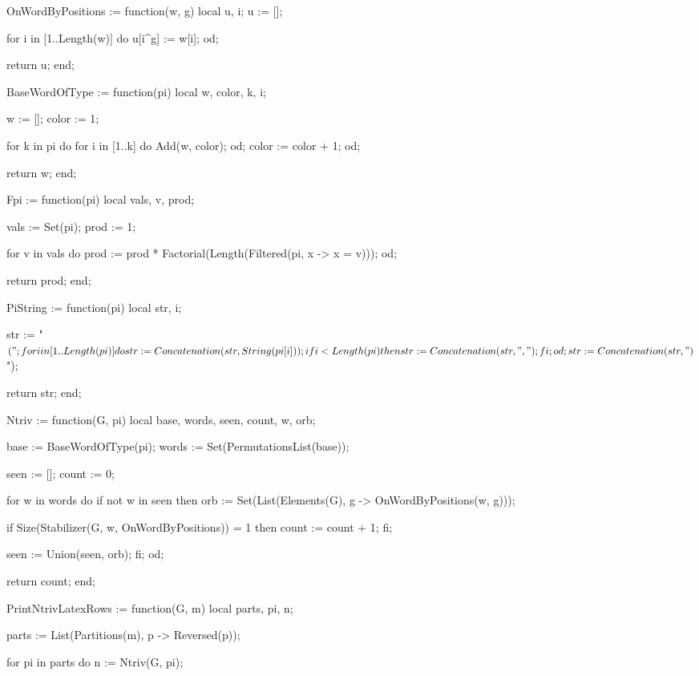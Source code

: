 OnWordByPositions := function(w, g)
    local u, i;
    u := [];

    for i in [1..Length(w)] do
        u[i^g] := w[i];
    od;

    return u;
end;

BaseWordOfType := function(pi)
    local w, color, k, i;

    w := [];
    color := 1;

    for k in pi do
        for i in [1..k] do
            Add(w, color);
        od;
        color := color + 1;
    od;

    return w;
end;

Fpi := function(pi)
    local vals, v, prod;

    vals := Set(pi);
    prod := 1;

    for v in vals do
        prod := prod * Factorial(Length(Filtered(pi, x -> x = v)));
    od;

    return prod;
end;

PiString := function(pi)
    local str, i;

    str := "$(";

    for i in [1..Length(pi)] do
        str := Concatenation(str, String(pi[i]));

        if i < Length(pi) then
            str := Concatenation(str, ",");
        fi;
    od;

    str := Concatenation(str, ")$");

    return str;
end;

Ntriv := function(G, pi)
    local base, words, seen, count, w, orb;

    base := BaseWordOfType(pi);
    words := Set(PermutationsList(base));

    seen := [];
    count := 0;

    for w in words do
        if not w in seen then
            orb := Set(List(Elements(G), g -> OnWordByPositions(w, g)));

            if Size(Stabilizer(G, w, OnWordByPositions)) = 1 then
                count := count + 1;
            fi;

            seen := Union(seen, orb);
        fi;
    od;

    return count;
end;

PrintNtrivLatexRows := function(G, m)
    local parts, pi, n;

    parts := List(Partitions(m), p -> Reversed(p));

    for pi in parts do
        n := Ntriv(G, pi);

